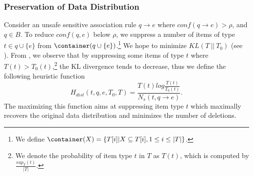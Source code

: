 \subsubsection{Preservation of Data Distribution}
Consider an unsafe sensitive association rule $q \rightarrow e$ where
$conf(q \rightarrow e) > \rho$, and $q \in B$.
To reduce $conf(q,e)$ below $\rho$,
we suppress a number of items of type $t\in q \cup \{e\}$ from
$\container(q\cup \{e\})$.\footnote{We define $\container(X)=\{T[i]|X\subseteq T[i], 1\le i\le |T|\}$.} We hope to minimize $KL(T ~||~ T_0)$
(see ).
From , we observe that by suppressing some items of type $t$
where $T(t)>T_0(t)$,\footnote{We denote the probability of item type $t$ in $T$
as $T(t)$, which is computed by $\frac{sup_T(t)}{|T|}$.}
the KL divergence tends to decrease, thus we define
the following heuristic function
\begin{equation}\label{eq:hdist}
H_{dist}(t, q, e, T_0, T) =
	\frac{T(t)log\frac{T(t)}{T_0(t)}}{N_s(t, q\rightarrow e)}.
\end{equation}
The maximizing this function aims at
suppressing item type $t$ which maximally recovers the original
data distribution and minimizes the number of deletions.

